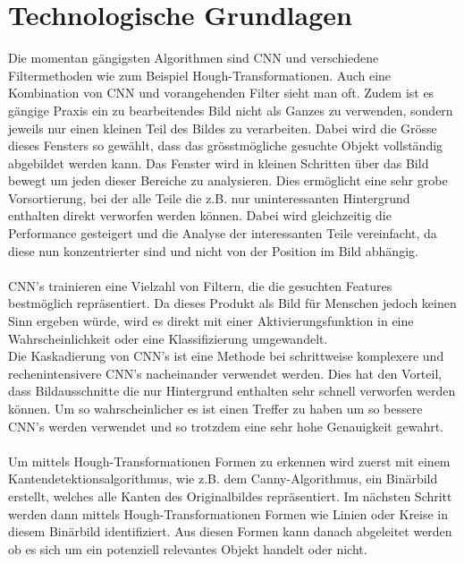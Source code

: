 \section{Technologische Grundlagen}
\label{sec:technicalBase}
Die momentan gängigsten Algorithmen sind \gls{CNN} \parencite{li2015convolutional} und verschiedene Filtermethoden wie zum Beispiel Hough-Transformationen\parencite{ye2015new}. Auch eine Kombination von \gls{CNN} und vorangehenden Filter sieht man oft. Zudem ist es gängige Praxis ein zu bearbeitendes Bild nicht als Ganzes zu verwenden, sondern jeweils nur einen kleinen Teil des Bildes zu verarbeiten. Dabei wird die Grösse dieses Fensters so gewählt, dass das grösstmögliche gesuchte Objekt vollständig abgebildet werden kann. Das Fenster wird in kleinen Schritten über das Bild bewegt um jeden dieser Bereiche zu analysieren. Dies ermöglicht eine sehr grobe Vorsortierung, bei der alle Teile die z.B. nur uninteressanten Hintergrund enthalten direkt verworfen werden können. Dabei wird gleichzeitig die Performance gesteigert und die Analyse der interessanten Teile vereinfacht, da diese nun konzentrierter sind und nicht von der Position im Bild abhängig.\\
\\
\gls{CNN}’s trainieren eine Vielzahl von Filtern, die die gesuchten Features bestmöglich repräsentiert. Da dieses Produkt als Bild für Menschen jedoch keinen Sinn ergeben würde, wird es direkt mit einer Aktivierungsfunktion in eine Wahrscheinlichkeit oder eine Klassifizierung umgewandelt.\\
Die Kaskadierung von \gls{CNN}’s ist eine Methode bei schrittweise komplexere und rechenintensivere \gls{CNN}’s nacheinander verwendet werden. Dies hat den Vorteil, dass Bildausschnitte die nur Hintergrund enthalten sehr schnell verworfen werden können. Um so wahrscheinlicher es ist einen Treffer zu haben um so bessere \gls{CNN}’s werden verwendet und so trotzdem eine sehr hohe Genauigkeit gewahrt.\\
\\
Um mittels Hough-Transformationen Formen zu erkennen wird zuerst mit einem Kantendetektionsalgorithmus, wie z.B. dem Canny-Algorithmus, ein Binärbild erstellt, welches alle Kanten des Originalbildes repräsentiert. Im nächsten Schritt werden dann mittels Hough-Transformationen Formen wie Linien oder Kreise in diesem Binärbild identifiziert. Aus diesen Formen kann danach abgeleitet werden ob es sich um ein potenziell relevantes Objekt handelt oder nicht.\\
\\
